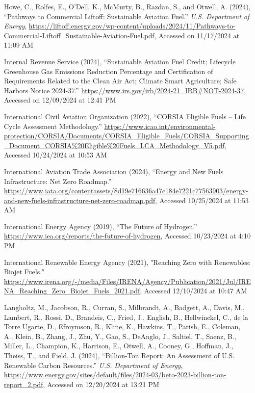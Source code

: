 \documentclass[12pt]{article}
\begin{document}
\begin{description}
    \item Howe, C., Rolfes, E., O’Dell, K., McMurty, B., Razdan, S., and Otwell, A. (2024), “Pathways to Commercial Liftoff: Sustainable Aviation Fuel.” \textit{U.S. Department of Energy}, \url{https://liftoff.energy.gov/wp-content/uploads/2024/11/Pathways-to-Commercial-Liftoff_Sustainable-Aviation-Fuel.pdf}, Accessed on 11/17/2024 at 11:09 AM
    
    \item Internal Revenue Service (2024), “Sustainable Aviation Fuel Credit; Lifecycle Greenhouse Gas Emissions Reduction Percentage and Certification of Requirements Related to the Clean Air Act; Climate Smart Agriculture; Safe Harbors Notice 2024-37.” \url{https://www.irs.gov/irb/2024-21_IRB#NOT-2024-37}, Accessed on 12/09/2024 at 12:41 PM
    
    \item International Civil Aviation Organization (2022), “CORSIA Eligible Fuels – Life Cycle Assessment Methodology.” \url{https://www.icao.int/environmental-protection/CORSIA/Documents/CORSIA_Eligible_Fuels/CORSIA_Supporting_Document_CORSIA%20Eligible%20Fuels_LCA_Methodology_V5.pdf}, Accessed 10/24/2024 at 10:53 AM
    
    \item International Aviation Trade Association (2024), “Energy and New Fuels Infrastructure: Net Zero Roadmap.” \url{https://www.iata.org/contentassets/8d19e716636a47c184e7221c77563903/energy-and-new-fuels-infrastructure-net-zero-roadmap.pdf}, Accessed 10/25/2024 at 11:53 AM
    
    \item International Energy Agency (2019), “The Future of Hydrogen.” \url{https://www.iea.org/reports/the-future-of-hydrogen}, Accessed 10/23/2024 at 4:10 PM
    
    \item International Renewable Energy Agency (2021), "Reaching Zero with Renewables: Biojet Fuels." \url{https://www.irena.org/-/media/Files/IRENA/Agency/Publication/2021/Jul/IRENA_Reaching_Zero_Biojet_Fuels_2021.pdf}, Accessed 12/10/2024 at 10:47 AM
    
    \item Langholtz, M., Jacobson, R., Curran, S., Milbrandt, A., Badgett, A., Davis, M., Lambert, R., Rossi, D., Brandeis, C., Fried, J., English, B., Hellwinckel, C., de la Torre Ugarte, D., Efroymson, R., Kline, K., Hawkins, T., Parish, E., Coleman, A., Klein, B., Zhang, J., Zhu, Y., Gao, S., DeAnglo, J., Saltiel, T., Saenz, B., Miller, L., Champion, K., Harrison, E., Otwell, A., Cooney, G., Hoffman, J., Theiss, T., and Field, J. (2024), “Billion-Ton Report: An Assessment of U.S. Renewable Carbon Resources.” \textit{U.S. Department of Energy}, \url{https://www.energy.gov/sites/default/files/2024-03/beto-2023-billion-ton-report_2.pdf}, Accessed on 12/20/2024 at 13:21 PM
    

\end{description}
\end{document}
